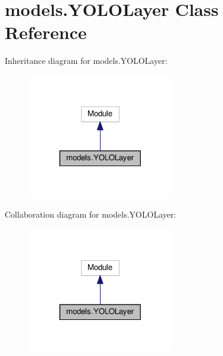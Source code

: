 \hypertarget{classmodels_1_1YOLOLayer}{}\section{models.\+Y\+O\+L\+O\+Layer Class Reference}
\label{classmodels_1_1YOLOLayer}


Inheritance diagram for models.\+Y\+O\+L\+O\+Layer\+:
\nopagebreak
\begin{figure}[H]
\begin{center}
\leavevmode
\includegraphics[width=182pt]{classmodels_1_1YOLOLayer__inherit__graph}
\end{center}
\end{figure}


Collaboration diagram for models.\+Y\+O\+L\+O\+Layer\+:
\nopagebreak
\begin{figure}[H]
\begin{center}
\leavevmode
\includegraphics[width=182pt]{classmodels_1_1YOLOLayer__coll__graph}
\end{center}
\end{figure}

